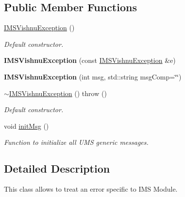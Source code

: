 \subsection*{Public Member Functions}
\begin{DoxyCompactItemize}
\item 
\hyperlink{classIMSVishnuException_ae0a05df539e5fc2e4bbb60cdd1a8bdbe}{IMSVishnuException} ()
\begin{DoxyCompactList}\small\item\em Default constructor. \item\end{DoxyCompactList}\item 
\hypertarget{classIMSVishnuException_a929e0c4298504b04ff6e5631e27f9447}{
{\bfseries IMSVishnuException} (const \hyperlink{classIMSVishnuException}{IMSVishnuException} \&e)}
\label{classIMSVishnuException_a929e0c4298504b04ff6e5631e27f9447}

\item 
\hypertarget{classIMSVishnuException_af8dd58535469e831663d808cb39b5188}{
{\bfseries IMSVishnuException} (int msg, std::string msgComp=\char`\"{}\char`\"{})}
\label{classIMSVishnuException_af8dd58535469e831663d808cb39b5188}

\item 
\hypertarget{classIMSVishnuException_a6a76a06ef20bd443a00ef57b5441d8b6}{
\hyperlink{classIMSVishnuException_a6a76a06ef20bd443a00ef57b5441d8b6}{$\sim$IMSVishnuException} ()  throw ()}
\label{classIMSVishnuException_a6a76a06ef20bd443a00ef57b5441d8b6}

\begin{DoxyCompactList}\small\item\em Default constructor. \item\end{DoxyCompactList}\item 
\hypertarget{classIMSVishnuException_a9d59bcf2fe80770a4cdc88d5e91d2476}{
void \hyperlink{classIMSVishnuException_a9d59bcf2fe80770a4cdc88d5e91d2476}{initMsg} ()}
\label{classIMSVishnuException_a9d59bcf2fe80770a4cdc88d5e91d2476}

\begin{DoxyCompactList}\small\item\em Function to initialize all UMS generic messages. \item\end{DoxyCompactList}\end{DoxyCompactItemize}


\subsection{Detailed Description}
This class allows to treat an error specific to IMS Module. 

